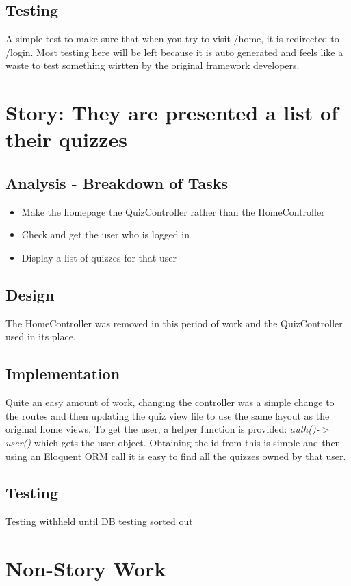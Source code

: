 \documentclass{article}
\begin{document}
\subsection{Testing}
A simple test to make sure that when you try to visit /home, it is redirected to /login. Most testing here will be left because it is auto generated and feels like a waste to test something wirtten by the original framework developers.
\newpage

\section{Story: They are presented a list of their quizzes}
\subsection{Analysis - Breakdown of Tasks}
\begin{itemize}
	\item Make the homepage the QuizController rather than the HomeController
	\item Check and get the user who is logged in
	\item Display a list of quizzes for that user
\end{itemize}
\subsection{Design}
The HomeController was removed in this period of work and the QuizController used in its place.
\subsection{Implementation}
Quite an easy amount of work, changing the controller was a simple change to the routes and then updating the quiz view file to use the same layout as the original home views. To get the user, a helper function is provided: \textit{auth()-$>$user()} which gets the user object. Obtaining the id from this is simple and then using an Eloquent ORM call it is easy to find all the quizzes owned by that user.
\subsection{Testing}
Testing withheld until DB testing sorted out
\newpage

\section{Non-Story Work}
\end{document}
